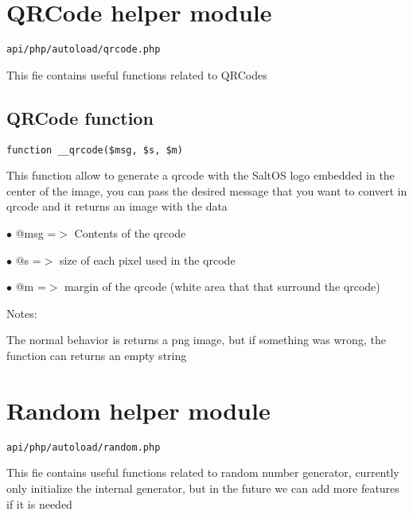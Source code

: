 \documentclass[a4paper]{book}
\begin{document}
\hypertarget{toc228}{}
\section{QRCode helper module}

\begin{lstlisting}
api/php/autoload/qrcode.php
\end{lstlisting}

This fie contains useful functions related to QRCodes

\hypertarget{toc229}{}
\subsection{QRCode function}

\begin{lstlisting}
function __qrcode($msg, $s, $m)
\end{lstlisting}

This function allow to generate a qrcode with the SaltOS logo embedded
in the center of the image, you can pass the desired message that you
want to convert in qrcode and it returns an image with the data

\begin{compactitem}
\item[\color{myblue}$\bullet$] @msg =$>$ Contents of the qrcode
\item[\color{myblue}$\bullet$] @s   =$>$ size of each pixel used in the qrcode
\item[\color{myblue}$\bullet$] @m   =$>$ margin of the qrcode (white area that that surround the qrcode)
\end{compactitem}

Notes:

The normal behavior is returns a png image, but if something was wrong,
the function can returns an empty string

\hypertarget{toc230}{}
\section{Random helper module}

\begin{lstlisting}
api/php/autoload/random.php
\end{lstlisting}

This fie contains useful functions related to random number generator, currently only initialize
the internal generator, but in the future we can add more features if it is needed
\end{document}

